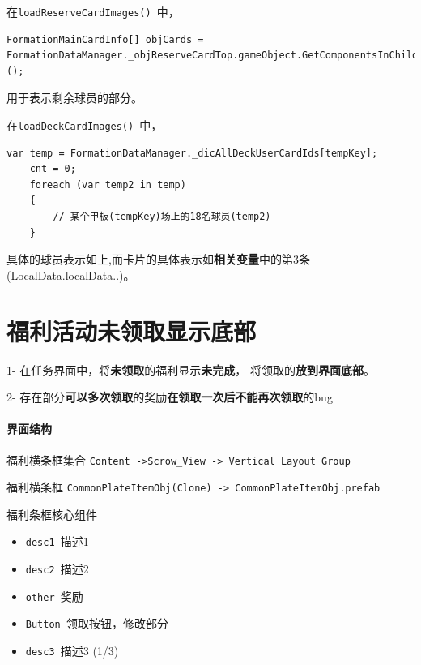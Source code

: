 \documentclass[UTF8,a4paper,12pt]{ctexbook}
\begin{document}
   			在\verb|loadReserveCardImages() |中，
   				\begin{lstlisting}[frame = L, xleftmargin = .079\textwidth]
   	FormationMainCardInfo[] objCards = FormationDataManager._objReserveCardTop.gameObject.GetComponentsInChildren<FormationMainCardInfo>();
   				\end{lstlisting}
   				
   			用于表示剩余球员的部分。
   			
   			在\verb|loadDeckCardImages() |中，
   				\begin{lstlisting}[frame = L, xleftmargin = .079\textwidth]
   	var temp = FormationDataManager._dicAllDeckUserCardIds[tempKey];
   	cnt = 0;
   	foreach (var temp2 in temp)
   	{
   		// 某个甲板(tempKey)场上的18名球员(temp2)
   	}
   				\end{lstlisting}
   			具体的球员表示如上,而卡片的具体表示如\textbf{相关变量}中的第3条(LocalData.localData..)。
   	
   	\section{福利活动未领取显示底部}
   		1- 在任务界面中，将\textbf{未领取}的福利显示\textbf{未完成}， 将领取的\textbf{放到界面底部}。
 		
 		2- 存在部分\textbf{可以多次领取}的奖励\textbf{在领取一次后不能再次领取}的bug
 		
 		\paragraph{界面结构}
 			
 			福利横条框集合
 			\verb|Content ->Scrow_View -> Vertical Layout Group|
 			
 			福利横条框
 			\verb|CommonPlateItemObj(Clone) -> CommonPlateItemObj.prefab| 
 			
 			福利条框核心组件
 			\begin{itemize}
 				\item \verb|desc1 |描述1
 				\item \verb|desc2 |描述2 
 				\item \verb|other |奖励
 				\item \verb|Button |领取按钮，修改部分
 				\item \verb|desc3 |描述3 (1/3)
 			\end{itemize}
 		
\end{document}
